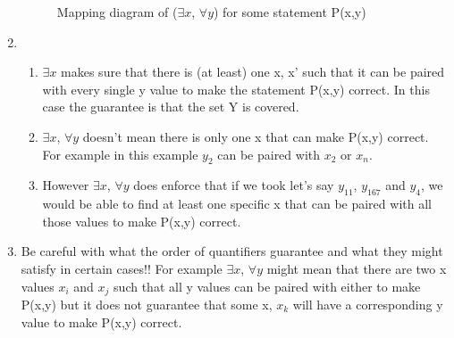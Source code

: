 \documentclass[11pt]{article}
\begin{document}
\begin{enumerate}
\begin{figure}[ht]
\centering
{}
\caption{Mapping diagram of ($\exists x$, $\forall y$) for some statement P(x,y)}
\end{figure}
\item 
\begin{enumerate}
\item $\exists x$ makes sure that there is (at least) one x, x' such that it can be paired with every single y value to make the statement P(x,y) correct. In this case the guarantee is that the set Y is covered.
\item $\exists x$, $\forall y$ doesn't mean there is only one x that can make P(x,y) correct. For example in this example $y_2$ can be paired with $x_2$ or $x_n$. 
\item However $\exists x$, $\forall y$ does enforce that if we took let's say $y_11$, $y_167$ and $y_4$, we would be able to find at least one specific x that can be paired with all those values to make P(x,y) correct.
\end{enumerate}
\item Be careful with what the order of quantifiers guarantee and what they might satisfy in certain cases!! For example $\exists x$, $\forall y$ might mean that there are two x values $x_i$ and $x_j$ such that all y values can be paired with either to make P(x,y) but it does not guarantee that some x, $x_k$ will have a corresponding y value to make P(x,y) correct. 
\end{enumerate}
\newpage
\end{document}
